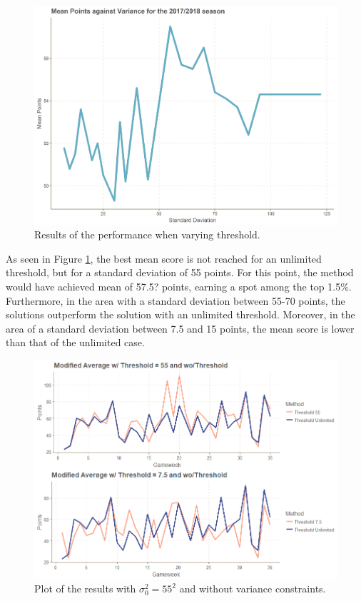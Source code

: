 \begin{figure}[H]
    \centering
    \includegraphics[scale=0.5]{fig/chapter_7/var.png}
    \caption{Results of the performance when varying threshold.}
\label{fig:performance_varying_threshold}    
\end{figure}%


As seen in Figure \ref{fig:performance_varying_threshold}, the best mean score is not reached for an unlimited threshold, but for a standard deviation of 55 points. For this point, the method would have achieved mean of 57.5? points, earning a spot among the top 1.5\%. Furthermore, in the area with a standard deviation between 55-70 points, the solutions outperform the solution with an unlimited threshold. Moreover, in the area of a standard deviation between 7.5 and 15 points, the mean score is lower than that of the unlimited case. 

\begin{figure}[H]
    \centering
    \includegraphics[scale=0.5]{fig/chapter_7/var_threshold.png}
    \caption{Plot of the results with $\sigma_0^{2} = 55^2$ and without variance constraints.}
\label{fig:performance_different_threshold}    
\end{figure}%
\newpar

